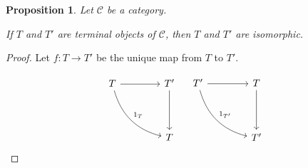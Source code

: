 \documentclass{article}
\newtheorem{proposition}{Proposition}[section]
\begin{document}
    \vspace{0.2in}

    \begin{proposition}
        Let $\mathcal{C}$ be a category.

        If  $T$ and $T'$ are terminal objects of $\mathcal{C}$, then $T$ and $T'$ are isomorphic.
    \end{proposition}

    \vspace{0.2in}

    \begin{proof}
        Let $f: T \to T'$ be the unique map from $T$ to $T'$.

        \[
            \begin{array}{c c} %
                \begin{tikzcd}[column sep=4em, row sep=4em]
                    T  \arrow[r] \arrow[dr, bend right, "1_{T}"]
                    & T'  \arrow[d]\\
                    & T
                \end{tikzcd}
                &
                \begin{tikzcd}[column sep=4em, row sep=4em]
                    T'  \arrow[r] \arrow[dr, bend right, "1_{T'}"]
                    & T  \arrow[d]\\
                    & T'
                \end{tikzcd} \\
            \end{array}
        \]
    \end{proof}
\end{document}
